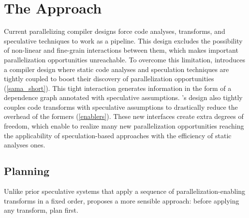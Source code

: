 \section{The \name Approach}
\label{sec:approach}

Current parallelizing compiler designs force code analyses, transforms, and speculative techniques to work as a pipeline.
This design excludes the possibility of non-linear and fine-grain interactions between them, which makes important parallelization opportunities unreachable.
To overcome this limitation, \name introduces a compiler design where static code analyses and speculation techniques are tightly coupled to boost their discovery of parallelization opportunities (\cref{sama_short}).
This tight interaction generates information in the form of a dependence graph annotated with speculative assumptions.
\namensp's design also tightly couples code transforms with speculative assumptions to drastically reduce the overhead of the formers (\cref{enablers}).
These new interfaces create extra degrees of freedom, which enable \name to realize many new parallelization opportunities reaching the applicability of speculation-based approaches with the efficiency of static analyses ones.


\subsection{Planning}
\label{planning}
%
Unlike prior speculative systems that apply a sequence of
parallelization-enabling transforms in a fixed order, \name proposes a
more sensible approach: before applying any transform, plan
first.

